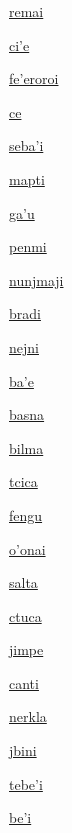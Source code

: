 {\hyperlink{val:remai}{remai}}{}{}{}

{\hyperlink{val:cihe}{ci'e}}{}{}{}

{\hyperlink{val:feheroroi}{fe'eroroi}}{}{}{}

{\hyperlink{val:ce}{ce}}{}{}{}

{\hyperlink{val:sebahi}{seba'i}}{}{}{}

{\hyperlink{val:mapti}{mapti}}{}{}{}

{\hyperlink{val:gahu}{ga'u}}{}{}{}

{\hyperlink{val:penmi}{penmi}}{}{}{}

{\hyperlink{val:nunjmaji}{nunjmaji}}{}{}{}

{\hyperlink{val:bradi}{bradi}}{}{}{}

{\hyperlink{val:nejni}{nejni}}{}{}{}

{\hyperlink{val:bahe}{ba'e}}{}{}{}

{\hyperlink{val:basna}{basna}}{}{}{}

{\hyperlink{val:bilma}{bilma}}{}{}{}

{\hyperlink{val:tcica}{tcica}}{}{}{}

{\hyperlink{val:fengu}{fengu}}{}{}{}

{\hyperlink{val:ohonai}{o'onai}}{}{}{}

{\hyperlink{val:salta}{salta}}{}{}{}

{\hyperlink{val:ctuca}{ctuca}}{}{}{}

{\hyperlink{val:jimpe}{jimpe}}{}{}{}

{\hyperlink{val:canti}{canti}}{}{}{}

{\hyperlink{val:nerkla}{nerkla}}{}{}{}

{\hyperlink{val:jbini}{jbini}}{}{}{}

{\hyperlink{val:tebehi}{tebe'i}}{}{}{}

{\hyperlink{val:behi}{be'i}}{}{}{}

